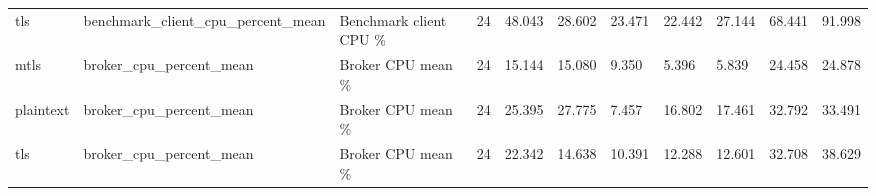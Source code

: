\begin{tabular}{lllllllllll}
tls & benchmark\_client\_cpu\_percent\_mean & Benchmark client CPU \% & 24 & 48.043 & 28.602 & 23.471 & 22.442 & 27.144 & 68.441 & 91.998 \\
mtls & broker\_cpu\_percent\_mean & Broker CPU mean \% & 24 & 15.144 & 15.080 & 9.350 & 5.396 & 5.839 & 24.458 & 24.878 \\
plaintext & broker\_cpu\_percent\_mean & Broker CPU mean \% & 24 & 25.395 & 27.775 & 7.457 & 16.802 & 17.461 & 32.792 & 33.491 \\
tls & broker\_cpu\_percent\_mean & Broker CPU mean \% & 24 & 22.342 & 14.638 & 10.391 & 12.288 & 12.601 & 32.708 & 38.629 \\
\hline
\end{tabular}
